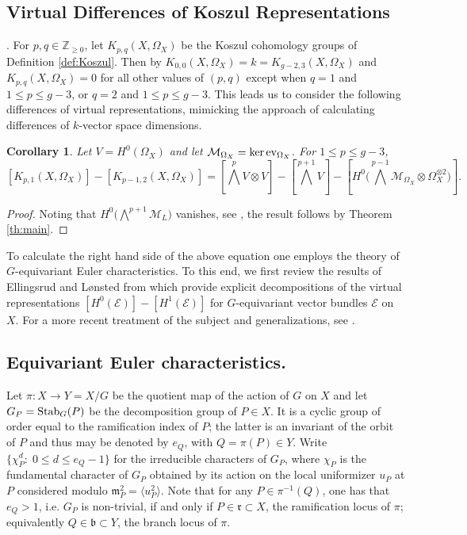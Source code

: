 \documentclass[10pt]{amsart}
\newtheorem{corollary}[theorem]{Corollary}
\theoremstyle{definition}
\begin{document}
\subsection{Virtual Differences of Koszul Representations}. For $p,q\in\mathbb{Z}_{\geq 0}$, let $K_{p,q}(X,\Omega_X)$ be the Koszul cohomology groups of Definition \ref{def:Koszul}. Then by \cite[3.6]{MR3729076} $K_{0,0}(X,\Omega_X)=k=K_{g-2,3}(X,\Omega_X)$ and $K_{p,q}(X,\Omega_X)=0$ for all other values of $(p,q)$ except when $q=1$ and $1\leq p\leq g-3$, or $q=2$ and $1\leq p\leq g-3$. This leads us to consider the following differences of virtual representations, mimicking the approach of calculating differences of $k$-vector space dimensions.

\begin{corollary}\label{cor:bettivanish}
Let $V=H^0(\Omega_X)$ and let $\mathcal{M}_{\Omega_X}=\ker{\rm ev}_{\Omega_X}$. For $1\leq p\leq g-3$,
\[
[K_{p,1}(X,\Omega_X)]-[K_{p-1,2}(X,\Omega_X)]=
[\bigwedge^{p}V\otimes V]-[\bigwedge^{p+1}V]
-[H^0\big(\bigwedge^{p-1}\mathcal{M}_{\Omega_X}\otimes \Omega_X^{\otimes 2}\big)].
\]
\end{corollary}
\begin{proof}
Noting that $H^0\big( \bigwedge^{p+1}\mathcal{M}_L\big)$ vanishes, see \cite[Remark 2.6]{MR2573635}, the result follows by Theorem \ref{th:main}.
\end{proof}
To calculate the right hand side of the above equation one employs the theory of $G$-equivariant Euler characteristics. To this end, we first review the results of Ellingsrud and L\o nsted from \cite{MR589254} which provide explicit decompositions of the virtual representations $[H^0(\mathcal{E})]-[H^1(\mathcal{E})]$ for $G$-equivariant vector bundles $\mathcal{E}$ on $X$. For a more recent treatment of the subject and generalizations, see \cite{MR2205171}.

\subsection{ Equivariant Euler characteristics.}

Let $\pi:X\rightarrow Y=X/G$ be the quotient map of the action of $G$ on $X$ and let $G_P={\rm Stab}_G(P)$ be the decomposition group of $P\in X$. It is a cyclic group of order equal to the ramification index of $P$; the latter is an invariant of the orbit of $P$ and thus may be denoted by $e_Q$, with $Q=\pi(P)\in Y$. Write $\{\chi_P^d:\;0\leq d\leq e_Q-1\}$ for the irreducible characters of $G_P$, where $\chi_P$ is the fundamental character of $G_P$ obtained by its action on the local uniformizer $u_P$ at $P$ considered modulo $\mathfrak{m}_P^2=\langle u_P^2\rangle$. Note that for any $P\in\pi^{-1}(Q)$, one has that $e_Q>1$, i.e. $G_P$ is non-trivial, if and only if $P\in\mathfrak{r}\subset X$, the ramification locus of $\pi$; equivalently $Q\in\mathfrak{b}\subset Y$, the branch locus of $\pi$. 
\end{document}

